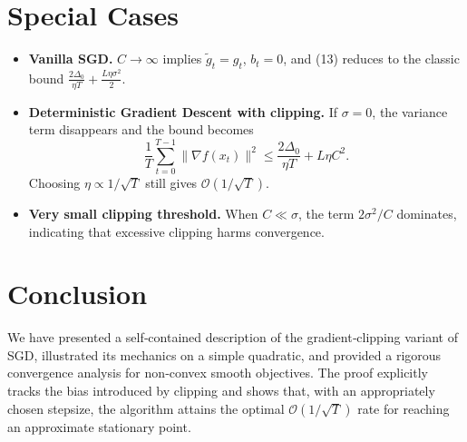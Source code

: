 \documentclass{article}
\begin{document}
\section*{Special Cases}
\begin{itemize}
    \item \textbf{Vanilla SGD.} $C\to\infty$ implies $\tilde g_{t}=g_{t}$, $b_{t}=0$, and (13) reduces to the classic bound $\frac{2\Delta_{0}}{\eta T}+ \frac{L\eta\sigma^{2}}{2}$.
    \item \textbf{Deterministic Gradient Descent with clipping.} If $\sigma=0$, the variance term disappears and the bound becomes
    \[
    \frac{1}{T}\sum_{t=0}^{T-1}\|\nabla f(x_{t})\|^{2}
    \le
    \frac{2\Delta_{0}}{\eta T}+L\eta C^{2}.
    \]
    Choosing $\eta\propto 1/\sqrt{T}$ still gives $\mathcal{O}(1/\sqrt{T})$.
    \item \textbf{Very small clipping threshold.} When $C\ll\sigma$, the term $2\sigma^{2}/C$ dominates, indicating that excessive clipping harms convergence.
\end{itemize}

\section*{Conclusion}
We have presented a self‑contained description of the gradient‑clipping variant of SGD, illustrated its mechanics on a simple quadratic, and provided a rigorous convergence analysis for non‑convex smooth objectives. The proof explicitly tracks the bias introduced by clipping and shows that, with an appropriately chosen stepsize, the algorithm attains the optimal $\mathcal{O}(1/\sqrt{T})$ rate for reaching an approximate stationary point.
\end{document}
